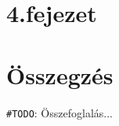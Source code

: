 \documentclass[tocnopagenum]{thesis-ekf}
\theoremstyle{definition}
\theoremstyle{remark}
\begin{document}
	\chapter*{4.fejezet}

	\chapter*{Összegzés}
	


	
	\verb*|#TODO|: Összefoglalás...
	
	

		\listoffigures
\end{document}
